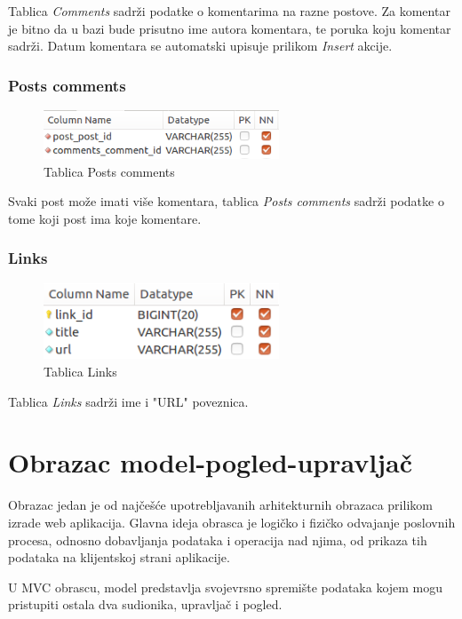 \documentclass[zavrsni, numeric]{fer}
\begin{document}
Tablica \textit{Comments} sadrži podatke o komentarima na razne postove. Za komentar je bitno da u bazi bude prisutno ime autora komentara, te poruka koju komentar sadrži. Datum komentara se automatski upisuje prilikom \textit{Insert} akcije.

\subsubsection{Posts comments}

\begin{figure}[H]
	\centering
	\includegraphics[width=7cm]{slike/t-posts_comments.png}
	\caption{Tablica Posts comments}
	\label{fig:t-posts_comments}
\end{figure}

Svaki post može imati više komentara, tablica \textit{Posts comments} sadrži podatke o tome koji post ima koje komentare.

\subsubsection{Links}

\begin{figure}[H]
	\centering
	\includegraphics[width=7cm]{slike/t-links.png}
	\caption{Tablica Links}
	\label{fig:t-links}
\end{figure}

Tablica \textit{Links} sadrži ime i "URL" poveznica.

\section{Obrazac model-pogled-upravljač}
Obrazac jedan je od najčešće upotrebljavanih arhitekturnih obrazaca prilikom izrade web aplikacija. Glavna ideja obrasca je logičko i fizičko odvajanje poslovnih procesa, odnosno dobavljanja podataka i operacija nad njima, od prikaza tih podataka na klijentskoj strani aplikacije.  

U MVC obrascu, model predstavlja svojevrsno spremište podataka kojem mogu pristupiti ostala dva sudionika, upravljač i pogled. 
\end{document}
